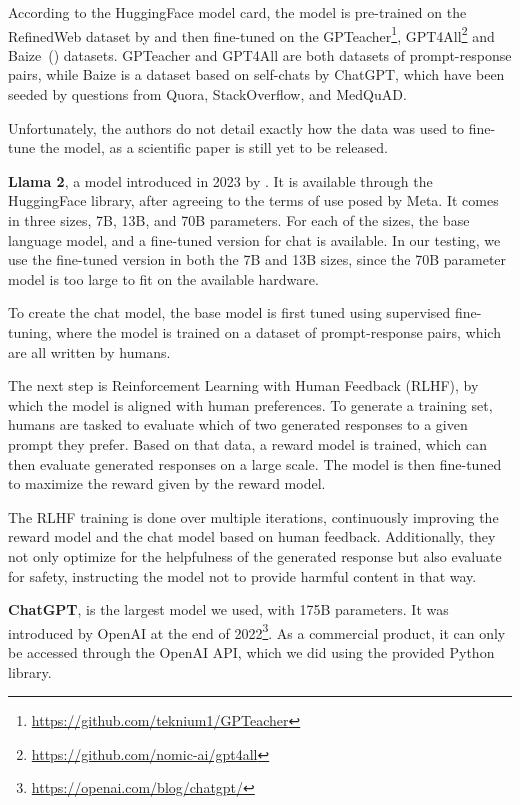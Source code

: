 According to the HuggingFace model card, the model is pre-trained on the RefinedWeb dataset by \cite{penedo:2023:The} and then fine-tuned on the GPTeacher\footnote{\url{https://github.com/teknium1/GPTeacher}}, GPT4All\footnote{\url{https://github.com/nomic-ai/gpt4all}} and Baize~(\cite{xu:2023:Baize}) datasets.
GPTeacher and GPT4All are both datasets of prompt-response pairs, while Baize is a dataset based on self-chats by ChatGPT, which have been seeded by questions from Quora, StackOverflow, and MedQuAD.

Unfortunately, the authors do not detail exactly how the data was used to fine-tune the model, as a scientific paper is still yet to be released.


\textbf{Llama 2}, a model introduced in 2023 by \cite{touvron:2023:Llama}.
It is available through the HuggingFace library, after agreeing to the terms of use posed by Meta.
It comes in three sizes, 7B, 13B, and 70B parameters.
For each of the sizes, the base language model, and a fine-tuned version for chat is available.
In our testing, we use the fine-tuned version in both the 7B and 13B sizes, since the 70B parameter model is too large to fit on the available hardware.

To create the chat model, the base model is first tuned using supervised fine-tuning, where the model is trained on a dataset of prompt-response pairs, which are all written by humans.

The next step is Reinforcement Learning with Human Feedback (RLHF), by which the model is aligned with human preferences. 
To generate a training set, humans are tasked to evaluate which of two generated responses to a given prompt they prefer.
Based on that data, a reward model is trained, which can then evaluate generated responses on a large scale.
The model is then fine-tuned to maximize the reward given by the reward model.

The RLHF training is done over multiple iterations, continuously improving the reward model and the chat model based on human feedback.
Additionally, they not only optimize for the helpfulness of the generated response but also evaluate for safety, instructing the model not to provide harmful content in that way.


\textbf{ChatGPT}, is the largest model we used, with 175B parameters. 
It was introduced by OpenAI at the end of 2022\footnote{\url{https://openai.com/blog/chatgpt/}}.
As a commercial product, it can only be accessed through the OpenAI API, which we did using the provided Python library.

